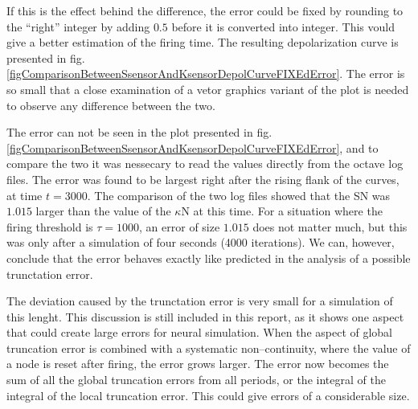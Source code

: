If this is the effect behind the difference, the error could be fixed by rounding to the ``right'' integer by adding $0.5$ before it is converted into integer.
This vould give a better estimation of the firing time.
The resulting depolarization curve is presented in fig. \ref{figComparisonBetweenSsensorAndKsensorDepolCurveFIXEdError}.
The error is so small that a close examination of a vetor graphics variant of the plot is needed to observe any difference between the two.

The error can not be seen in the plot presented in fig. \ref{figComparisonBetweenSsensorAndKsensorDepolCurveFIXEdError}, and to compare the two it was nessecary to read the values directly from the octave log files.
The error was found to be largest right after the rising flank of the curves, at time $t=3000$. 
The comparison of the two log files showed that the SN was $1.015$ larger than the value of the $\kappa$N at this time.
For a situation where the firing threshold is $\tau=1000$, an error of size $1.015$ does not matter much, but this was only after a simulation of four seconds (4000 iterations). 
We can, however, conclude that the error behaves exactly like predicted in the analysis of a possible trunctation error.

The deviation caused by the trunctation error is very small for a simulation of this lenght.
This discussion is still included in this report, as it shows one aspect that could create large errors for neural simulation. 
When the aspect of global truncation error is combined with a systematic non--continuity, where the value of a node is reset after firing, the error grows larger.
The error now becomes the sum of all the global truncation errors from all periods, or the integral of the integral of the local truncation error.
This could give errors of a considerable size. 

